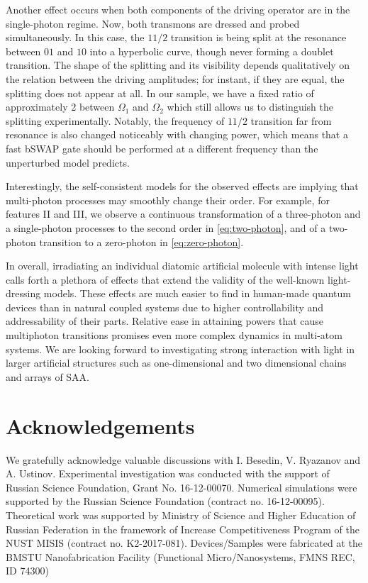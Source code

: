\documentclass[%
 aps, prx,
 amsmath,amssymb,
 reprint,%
superscriptaddress
]{revtex4-2}
\begin{document}
Another effect occurs when both 
components of the driving operator are in the 
single-photon regime. Now, both transmons are 
dressed and probed simultaneously. In this case, 
the $11/2$ transition is being split at the resonance between $01$ and $10$ into a hyperbolic curve, though never forming a doublet transition. The shape of the splitting and its visibility 
depends qualitatively on the relation between the driving 
amplitudes; for instant, if they are equal, the splitting does not appear at all. In our sample, we have a fixed ratio 
of approximately 2 between $\Omega_1$ and 
$\Omega_2$ which still allows us to distinguish the 
splitting experimentally. Notably, the frequency of $11/2$ transition far 
from resonance is also changed noticeably with 
changing power, which means that a fast bSWAP 
gate should be performed at a different frequency 
than the unperturbed model predicts. 

Interestingly, the self-consistent models for the 
observed effects are implying that multi-photon 
processes may smoothly change their order. For 
example, for features II and III, we observe a 
continuous transformation of a three-photon and a 
single-photon processes to the second order in 
\autoref{eq:two-photon}, and of a two-photon 
transition to a zero-photon in 
\autoref{eq:zero-photon}.

In overall, irradiating an individual diatomic artificial molecule with intense light calls forth a plethora of effects that extend the validity of the well-known light-dressing models. These effects are much easier to find in human-made quantum devices than in natural coupled systems due to higher controllability and addressability of their parts. Relative ease in attaining powers that cause multiphoton transitions promises even more complex dynamics in multi-atom systems. We are looking forward to investigating strong interaction with light in larger artificial structures such as one-dimensional and two dimensional chains and arrays of SAA.

\section{Acknowledgements}

We gratefully acknowledge valuable discussions with I. Besedin, V. Ryazanov and A. Ustinov. 
Experimental investigation was conducted with the support of Russian Science Foundation, Grant No. 16-12-00070. Numerical simulations were supported by the Russian Science Foundation (contract no. 16-12-00095). Theoretical work was supported by Ministry of Science and Higher Education of Russian Federation in the framework of Increase Competitiveness Program of the NUST MISIS (contract no. K2-2017-081). Devices/Samples were fabricated at the BMSTU Nanofabrication Facility (Functional Micro/Nanosystems, FMNS REC, ID 74300)
\end{document}
